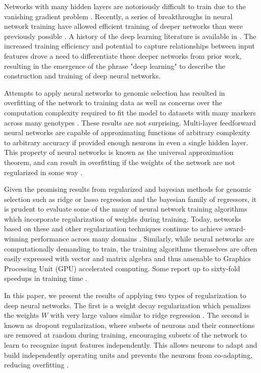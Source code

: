 \documentclass[9pt,twocolumn,twoside]{g3_article/gsag3jnl}
\begin{document}

Networks with many hidden layers are notoriously difficult to train due to
the vanishing gradient problem \citep{hochreiter1998}. Recently, a series 
of breakthroughs in neural network training have allowed efficient 
training of deeper networks than were previously possible \citep{sutskever2013}.
A history of the deep learning literature is available in \cite{lecun2015}.
The increased training efficiency and potential to capture relationships 
between input features drove a need to differentiate these deeper networks
from prior work, resulting in the emergence of the phrase "deep learning" 
to describe the construction and training of deep neural networks.

Attempts to apply neural networks to genomic selection has resulted in overfitting of the 
network to training data as well as concerns over the 
computation complexity required to fit the model to datasets with many
markers across many genotypes \citep{heslot2012, gonzalez-recio2014}. 
These results are not surprising. Multi-layer feedforward neural networks 
are capable of approximating functions of arbitrary complexity to arbitrary 
accuracy if provided enough neurons in even a single hidden 
layer. This property of neural networks is known as the 
universal approximation theorem, and can result in 
overfitting if the weights of the network are not regularized in some way \citep{hornik1989}.

Given the promising results from regularized and bayesian methods for 
genomic selection such as ridge or lasso regression and the bayesian family of regressors,
it is prudent to evaluate some of the many of neural network training algorithms which
incorporate regularization of weights during training. Today, networks based on these 
and other regularization techniques continue to achieve award-winning performance 
across many domains \citep{schmidhuber2015}. Similarly, while neural networks are 
computationally demanding to train, the training algorithms 
themselves are often easily expressed with vector and matrix algebra and thus amenable to
Graphics Processing Unit (GPU) accelerated computing. Some report up to sixty-fold speedups 
in training time \citep{sierra2010, schmidhuber2015}. 

In this paper, we present the results of applying two types of regularization
to deep neural networks. The first is a weight decay regularization
which penalizes the weights $W$ with very large values 
similar to ridge regression \citep{krogh1992}. The second is known as dropout 
regularization, where subsets of neurons and their connections are removed 
at random during training, encouraging subsets of the network to learn 
to recognize input features independently. This allows neurons to adapt 
and build independently operating units and prevents the 
neurons from co-adapting, reducing overfitting \citep{srivastava2014}.  
\end{document}
